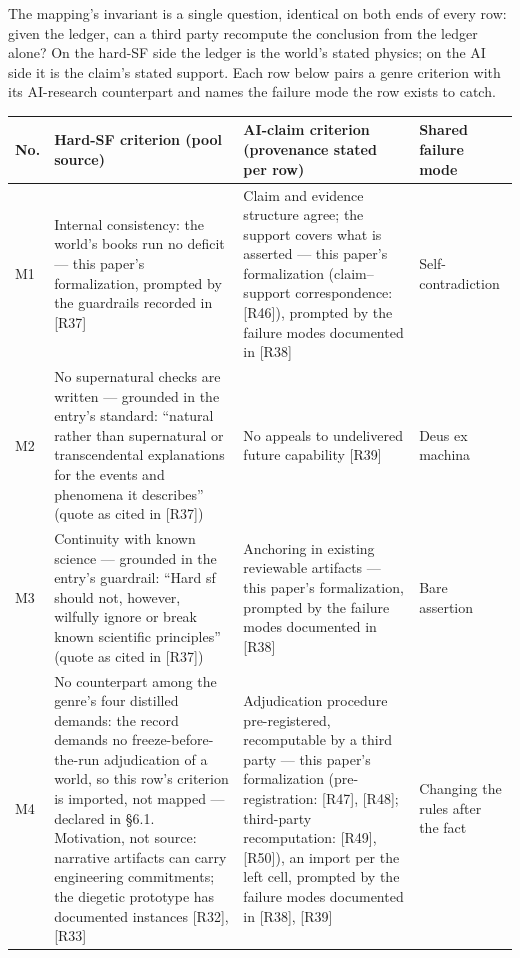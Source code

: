 \documentclass[11pt,a4paper]{article}
\begin{document}
The mapping's invariant is a single question, identical on both ends of every row: given the ledger, can a third party recompute the conclusion from the ledger alone? On the hard-SF side the ledger is the world's stated physics; on the AI side it is the claim's stated support. Each row below pairs a genre criterion with its AI-research counterpart and names the failure mode the row exists to catch.

\begin{table}[htbp]
\centering
\small
\setlength{\tabcolsep}{3.5pt}
\renewcommand{\arraystretch}{1.18}
\begin{tabularx}{0.985\textwidth}{@{}>{\raggedright\arraybackslash}p{}>{\raggedright\arraybackslash}X>{\raggedright\arraybackslash}X>{\raggedright\arraybackslash}p{}@{}}
\toprule
\textbf{No.} & \textbf{Hard-SF criterion (pool source)} & \textbf{AI-claim criterion (provenance stated per row)} & \textbf{Shared failure mode} \\
\midrule
M1 & Internal consistency: the world's books run no deficit — this paper's formalization, prompted by the guardrails recorded in [R37] & Claim and evidence structure agree; the support covers what is asserted — this paper's formalization (claim–support correspondence: [R46]), prompted by the failure modes documented in [R38] & Self-contradiction \\
M2 & No supernatural checks are written — grounded in the entry's standard: ``natural rather than supernatural or transcendental explanations for the events and phenomena it describes'' (quote as cited in [R37]) & No appeals to undelivered future capability [R39] & Deus ex machina \\
M3 & Continuity with known science — grounded in the entry's guardrail: ``Hard sf should not, however, wilfully ignore or break known scientific principles'' (quote as cited in [R37]) & Anchoring in existing reviewable artifacts — this paper's formalization, prompted by the failure modes documented in [R38] & Bare assertion \\
M4 & No counterpart among the genre's four distilled demands: the record demands no freeze-before-the-run adjudication of a world, so this row's criterion is imported, not mapped — declared in §6.1. Motivation, not source: narrative artifacts can carry engineering commitments; the diegetic prototype has documented instances [R32], [R33] & Adjudication procedure pre-registered, recomputable by a third party — this paper's formalization (pre-registration: [R47], [R48]; third-party recomputation: [R49], [R50]), an import per the left cell, prompted by the failure modes documented in [R38], [R39] & Changing the rules after the fact \\

\end{tabularx}
\end{table}
\end{document}
